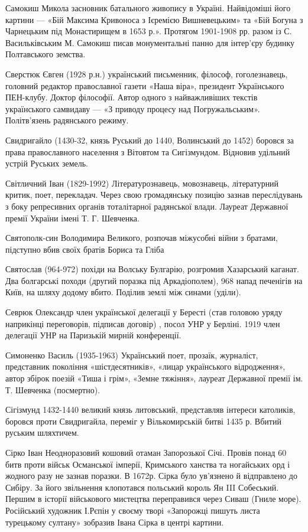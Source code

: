 Самокиш Микола  засновник батального живопису в Україні. Найвідоміші його картини --- «Бій Максима Кривоноса з Ієремією Вишневецьким» та «Бій Богуна з Чарнецьким під Монастирищем в 1653 р.». Протягом 1901-1908 рр. разом із С. Васильківським М. Самокиш писав монументальні панно для інтер’єру будинку Полтавського земства. 

Сверстюк Євген (1928 р.н.) український письменник, філософ, гоголезнавець, головний редактор православної газети «Наша віра», президент Українського ПЕН-клубу. Доктор філософії. Автор одного з найважливіших текстів українського самвидаву --- «З приводу процесу над Погружальським». Політв’язень радянського режиму.

Свидригайло (1430-32, князь Руський до 1440, Волинський до 1452) боровся за права православного населення з Вітовтом та Сигізмундом. Відновив удільний устрій Руських земель.

Світличний Іван (1829-1992) Літературознавець, мовознавець, літературний критик, поет, перекладач. Через свою громадянську позицію зазнав переслідувань з боку репресивних органів тоталітарної радянської влади. Лауреат Державної премії України імені Т. Г. Шевченка.

Святополк-син Володимира Великого, розпочав міжусобні війни з братами, підступно вбив своїх братів Бориса та Гліба

Святослав (964-972) похіди на Волську Булгарію, розгромив Хазарський каганат. Два болгарські походи (другий поразка під Аркадіополем), 968 напад печенігів на Київ, на шляху додому вбито. Поділив землі між синами (уділи).

Севрюк Олександр член української делегації у Бересті (став головою уряду наприкінці переговорів, підписав договір) , посол УНР у Берліні. 1919 член делегації УНР на Паризькій мирній конференції. 

Симоненко Bасиль (1935-1963) Український поет, прозаїк, журналіст, представник покоління «шістдесятників», «лицар українського відродження», автор збірок поезій «Тиша і грім», «Земне тяжіння», лауреат Державної премії ім. Т. Шевченка (посмертно).

Сігізмунд 1432-1440 великий князь литовський, представляв інтереси католиків, боровся проти Свидригайла, переміг у Вількомирській битві 1435 р. Вбитий руським шляхтичем.

Сірко Іван  Неодноразовий кошовий отаман Запорозької Січі. Провів понад 60 битв проти військ Османської імперії, Кримського ханства та ногайських орд і жодного разу не зазнав поразки. В 1672р. Сірка було ув’язнено й відправлено до Сибіру. За його звільнення клопотався польський король Ян III Собеський. Першим в історії військового мистецтва переправився через Сиваш (Гниле море). Російський художник І.Рєпін у своєму творі «Запорожці пишуть листа турецькому султану» зобразив Івана Сірка в центрі картини.

